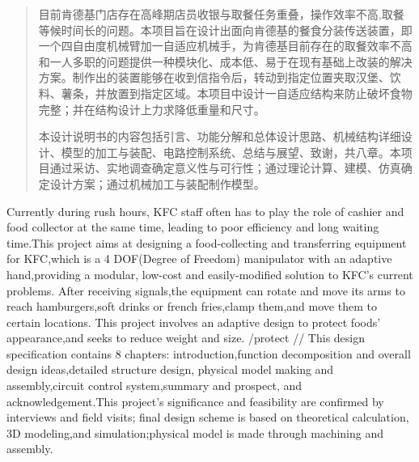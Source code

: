 
\begin{abstract}

  目前肯德基门店存在高峰期店员收银与取餐任务重叠，操作效率不高,取餐等候时间长的问题。本项目旨在设计出面向肯德基的餐食分装传送装置，即一个四自由度机械臂加一自适应机械手，为肯德基目前存在的取餐效率不高和一人多职的问题提供一种模块化、成本低、易于在现有基础上改装的解决方案。制作出的装置能够在收到信指令后，转动到指定位置夹取汉堡、饮料、薯条，并放置到指定区域。本项目中设计一自适应结构来防止破坏食物完整；并在结构设计上力求降低重量和尺寸。

  本设计说明书的内容包括引言、功能分解和总体设计思路、机械结构详细设计、模型的加工与装配、电路控制系统、总结与展望、致谢，共八章。本项目通过采访、实地调查确定意义性与可行性；通过理论计算、建模、仿真确定设计方案；通过机械加工与装配制作模型。
 
\end{abstract}

\begin{enabstract}
  Currently during rush hours, KFC staff often has to play the role of cashier and food collector at the same time, leading to poor efficiency and long waiting time.This project aims at designing a food-collecting and transferring equipment for KFC,which is a 4 DOF(Degree of Freedom) manipulator with an adaptive hand,providing a modular, low-cost and easily-modified  solution to KFC's current problems. After receiving signals,the equipment can rotate and move its arms to reach hamburgers,soft drinks or french fries,clamp them,and move them to certain locations. This project involves an adaptive design to protect foods' appearance,and seeks to reduce weight and size.
  /protect //
  This design specification contains 8 chapters: introduction,function decomposition and overall design ideas,detailed structure design, physical model making and assembly,circuit control system,summary and prospect, and acknowledgement.This project's significance and feasibility are confirmed by interviews and field visits; final design scheme is based on theoretical calculation, 3D modeling,and simulation;physical model is made through machining and assembly.
\end{enabstract}